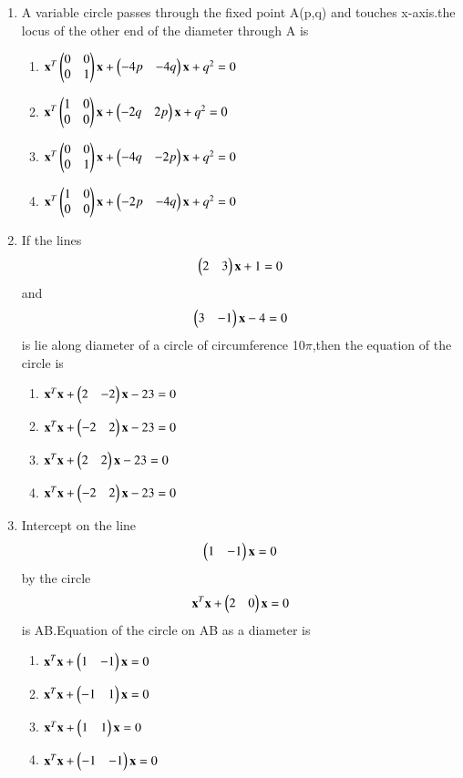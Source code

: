 \begin{enumerate}[label=\arabic*.,ref=\thesubsection.\theenumi]
\item A variable circle passes through the fixed point A(p,q) and touches x-axis.the locus of the other end of the diameter through A is
\begin{enumerate}
\item $\mathbf  x^T \begin{pmatrix}0 & 0 \\ 0 & 1\end{pmatrix}  \mathbf x+\begin{pmatrix}-4p&-4q\end{pmatrix}\mathbf x+q^2=0$
\item $\mathbf x^T \begin{pmatrix}1 & 0 \\ 0 & 0\end{pmatrix} \mathbf x+\begin{pmatrix}-2q&2p\end{pmatrix}\mathbf x+q^2=0$
\item $\mathbf x^T \begin{pmatrix}0 & 0 \\ 0 & 1\end{pmatrix}\mathbf x+\begin{pmatrix}-4q&-2p\end{pmatrix}\mathbf x+q^2=0$
\item $\mathbf x^T \begin{pmatrix}1 & 0 \\ 0 & 0\end{pmatrix}\mathbf x+\begin{pmatrix}-2p&-4q\end{pmatrix}\mathbf x+q^2=0$
\end{enumerate}
      
\item If the lines 
\begin{align}
\begin{pmatrix}2&3\end{pmatrix}\mathbf x+1=0
\end{align} 
and  
\begin{align}
\begin{pmatrix}3&-1\end{pmatrix}\mathbf x-4=0
\end{align} 
is lie along diameter of a circle of circumference 10$\pi$,then the equation of the circle is
\begin{enumerate}
\item $\mathbf x^T\mathbf x+\begin{pmatrix}2&-2\end{pmatrix}\mathbf x-23=0$
\item $\mathbf x^T\mathbf x+\begin{pmatrix}-2&2\end{pmatrix}\mathbf x-23=0$ 
\item $\mathbf x^T\mathbf x+\begin{pmatrix}2&2\end{pmatrix}\mathbf x-23=0$ 
\item $\mathbf x^T\mathbf x+\begin{pmatrix}-2&2\end{pmatrix}\mathbf x-23=0$
\end{enumerate}
    
\item Intercept on the line 
\begin{align}
\begin{pmatrix}1&-1\end{pmatrix}\mathbf x=0
\end{align} 
by the circle 
\begin{align}
\mathbf x^T\mathbf x + \begin{pmatrix}2&0\end{pmatrix}\mathbf x=0
\end{align} 
is AB.Equation of the circle on AB as a diameter is
\begin{enumerate}
\item $\mathbf x^T\mathbf x + \begin{pmatrix}1&-1\end{pmatrix}\mathbf x=0$ 
\item $\mathbf x^T\mathbf x + \begin{pmatrix}-1&1\end{pmatrix}\mathbf x=0$ 
\item $\mathbf x^T\mathbf x + \begin{pmatrix}1&1\end{pmatrix}\mathbf x=0$ 
\item $\mathbf x^T\mathbf x + \begin{pmatrix}-1&-1\end{pmatrix}\mathbf x=0$
\end{enumerate} 
   

\end{enumerate}
